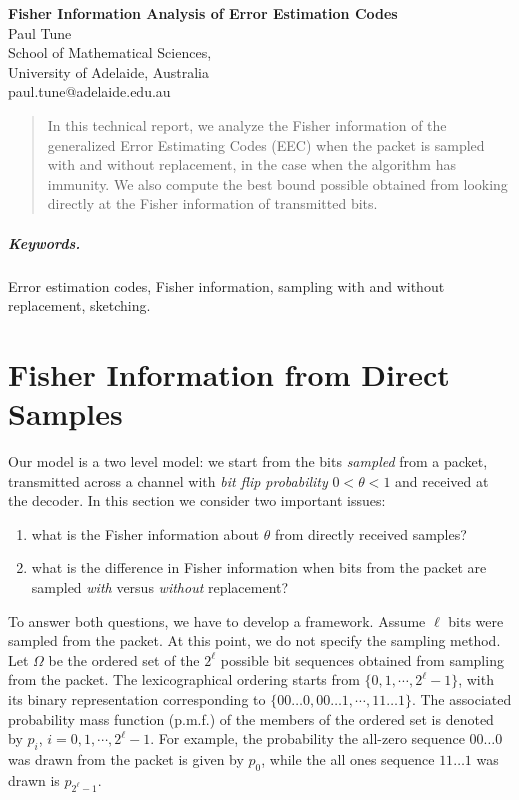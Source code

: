 \documentclass[12pt]{article}
\numberwithin{equation}{section}
\numberwithin{table}{section}
\numberwithin{figure}{section}
\begin{document}

\begin{center}
\textbf{\Large Fisher Information Analysis of Error Estimation Codes} \\[6pt]
  Paul Tune \\[6pt]
  School of Mathematical Sciences,\\
  University of Adelaide, Australia  \\[6pt]
  paul.tune@adelaide.edu.au
\end{center}

\begin{abstract}
In this technical report, we analyze the Fisher information of the generalized Error Estimating Codes (EEC) when the packet is sampled with 
and without replacement, in the case when the algorithm has immunity. We also compute the best bound possible obtained from looking 
directly at the Fisher information of transmitted bits.
\end{abstract}

\subparagraph{Keywords.} Error estimation codes, Fisher information, sampling with and without replacement,
sketching.



\section{Fisher Information from Direct Samples}

Our model is a two level model: we start from the bits \textit{sampled} from a packet, transmitted across a channel with \textit{bit flip probability} 
$0 < \theta < 1$ and received at the decoder. In this section we consider two important issues:
\begin{enumerate}
\item what is the Fisher information about $\theta$ from directly received samples?
\item what is the difference in Fisher information when bits from the packet are sampled \textit{with} versus \textit{without} replacement?
\end{enumerate}

To answer both questions, we have to develop a framework. Assume $\ell$ bits were sampled from the packet. At this point, we do not specify
the sampling method. Let $\Omega$ be the ordered set of the $2^\ell$ possible bit sequences obtained from sampling from the packet. The
lexicographical ordering starts from $\{0,1,\cdots,2^{\ell}-1\}$, with its binary representation corresponding to $\{00\ldots0, 00\ldots1,\cdots,
11\ldots1\}$. The associated probability mass function (p.m.f.) of the members of the ordered set is denoted by $p_i$, $i = 0,1,\cdots,
2^{\ell}-1$. For example, the probability the all-zero sequence $00\ldots0$ was drawn from the packet is given by $p_0$, while the all ones 
sequence $11\ldots1$ was drawn is $p_{2^\ell-1}$.
\end{document}
